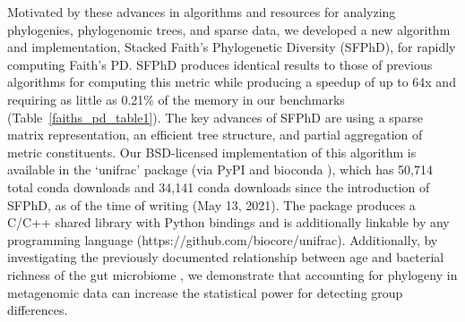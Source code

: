 Motivated by these advances in algorithms and resources for analyzing phylogenies, phylogenomic trees, and sparse data, we developed a new algorithm and implementation, Stacked Faith's Phylogenetic Diversity (SFPhD), for rapidly computing Faith’s PD. SFPhD produces identical results to those of previous algorithms for computing this metric while producing a speedup of up to 64x and requiring as little as 0.21\% of the memory in our benchmarks (Table~\ref{faiths_pd_table1}). The key advances of SFPhD are using a sparse matrix representation, an efficient tree structure, and partial aggregation of metric constituents. Our BSD-licensed implementation of this algorithm is available in the `unifrac' package (via PyPI and bioconda \cite{Gruning2018-fw}), which has 50,714 total conda downloads and 34,141 conda downloads since the introduction of SFPhD, as of the time of writing (May 13, 2021). The package produces a C/C++ shared library with Python bindings and is additionally linkable by any programming language (https://github.com/biocore/unifrac). Additionally, by investigating the previously documented relationship between age and bacterial richness of the gut microbiome \cite{De_la_Cuesta-Zuluaga2019-zr}, we demonstrate that accounting for phylogeny in metagenomic data can increase the statistical power for detecting group differences. 


